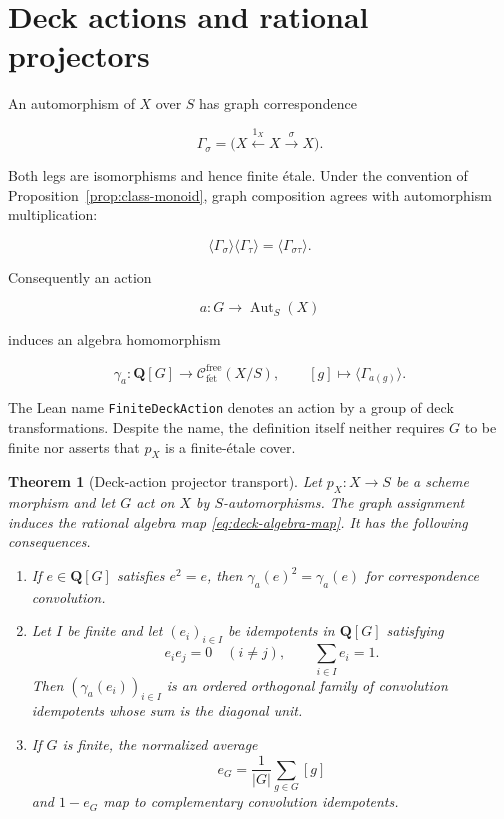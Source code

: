 \documentclass[11pt]{article}
\newtheorem{theorem}{Theorem}[section]
\theoremstyle{definition}
\theoremstyle{remark}
\newcommand{\Q}{\mathbf Q}
\newcommand{\fe}{\mathrm{f\acute et}}
\newcommand{\leanpath}[1]{\texttt{\nolinkurl{#1}}}
\begin{document}
\section{Deck actions and rational projectors}
\label{sec:deck-projectors}

An automorphism of \(X\) over \(S\) has graph correspondence

\[
  \Gamma_\sigma=
  \bigl(X\xleftarrow{1_X}X\xrightarrow{\sigma}X\bigr).
\]

Both legs are isomorphisms and hence finite \'etale.  Under the convention of
Proposition~\ref{prop:class-monoid}, graph composition agrees with
automorphism multiplication:

\begin{equation}
\label{eq:graph-product}
  \langle\Gamma_\sigma\rangle
  \langle\Gamma_\tau\rangle
  =\langle\Gamma_{\sigma\tau}\rangle.
\end{equation}

Consequently an action

\[
  a:G\longrightarrow\operatorname{Aut}_S(X)
\]

induces an algebra homomorphism

\begin{equation}
\label{eq:deck-algebra-map}
  \gamma_a:\Q[G]\longrightarrow
  \mathcal C_{\fe}^{\mathrm{free}}(X/S),
  \qquad
  [g]\longmapsto\langle\Gamma_{a(g)}\rangle.
\end{equation}

The Lean name \leanpath{FiniteDeckAction} denotes an action by a group of
deck transformations.  Despite the name, the definition itself neither
requires \(G\) to be finite nor asserts that \(p_X\) is a finite-\'etale
cover.

\begin{theorem}[Deck-action projector transport]
\label{thm:deck-transport}
Let \(p_X:X\to S\) be a scheme morphism and let \(G\) act on \(X\) by
\(S\)-automorphisms.  The graph assignment induces the rational algebra map
\eqref{eq:deck-algebra-map}.  It has the following consequences.

\begin{enumerate}[label=\textup{(\roman*)},leftmargin=2.6em]
  \item If \(e\in\Q[G]\) satisfies \(e^2=e\), then
        \(\gamma_a(e)^2=\gamma_a(e)\) for correspondence convolution.
  \item Let \(I\) be finite and let \((e_i)_{i\in I}\) be idempotents in
        \(\Q[G]\) satisfying
        \[
          e_ie_j=0\quad(i\ne j),
          \qquad
          \sum_{i\in I}e_i=1.
        \]
        Then \((\gamma_a(e_i))_{i\in I}\) is an ordered orthogonal family of
        convolution idempotents whose sum is the diagonal unit.
  \item If \(G\) is finite, the normalized average
        \[
          e_G=\frac{1}{|G|}\sum_{g\in G}[g]
        \]
        and \(1-e_G\) map to complementary convolution idempotents.
\end{enumerate}
\end{theorem}
\end{document}

